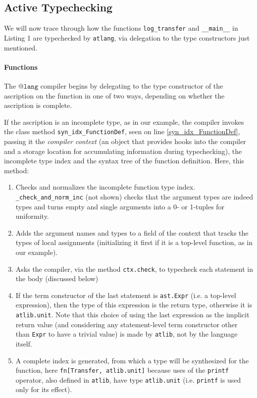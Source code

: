 \documentclass[9pt]{sigplanconf}
\newcommand{\lstinlinep}[1]{\lstinline[language=Python,basicstyle=\ttfamily\small,deletendkeywords={tuple,buffer,map}]{#1}}
\begin{document}
\subsection{Active Typechecking}\label{s:atc}
We will now trace through how the functions \lstinlinep{log_transfer} and \lstinlinep{__main__} in Listing 1 are typechecked by \verb|atlang|, via delegation to the type constructors just mentioned.

\paragraph{Functions}
The @$\texttt{lang}$ compiler begins by delegating to the type constructor of the ascription on the function in one of two ways, depending on whether the ascription is complete.

If the ascription is an incomplete type, as in our example, the compiler invokes the class method \lstinlinep{syn_idx_FunctionDef}, seen on line \ref{syn_idx_FunctionDef}, passing it the \emph{compiler context} (an object that provides hooks into the compiler and a storage location for accumulating information during typechecking), the incomplete type index and the syntax tree of the function definition. Here, this method: \begin{enumerate}
\item Checks and normalizes the  incomplete function type index. \lstinlinep{_check_and_norm_inc} (not shown) checks that the argument types are indeed types and turns empty and single arguments into a 0- or 1-tuples for uniformity.
\item Adds the argument names and types to a field of the context that tracks the types of local assignments (initializing it first if it is a top-level function, as in our example).
\item Asks the compiler, via the method \lstinlinep{ctx.check}, to typecheck each statement in the body (discussed below)
\item If the term constructor of the last statement is \lstinlinep{ast.Expr} (i.e. a top-level expression), then the type of this expression is the return type, otherwise it is \lstinlinep{atlib.unit}. Note that this choice of using the last expression as the implicit return value (and considering any statement-level term constructor other than \lstinlinep{Expr} to have a trivial value) is made by \verb|atlib|, not by the language itself.
\item A complete index is generated, from which a type will be synthesized for the function, here \lstinlinep{fn[Transfer, atlib.unit]} because uses of the \lstinlinep{printf} operator, also defined in \lstinlinep{atlib}, have type \verb|atlib.unit| (i.e. \lstinlinep{printf} is used only for its effect). 
\end{enumerate}%
\end{document}
